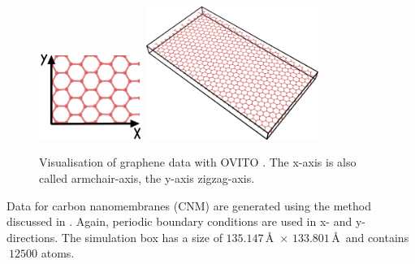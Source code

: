 \documentclass[preprint,12pt]{elsarticle}
\begin{document}
\begin{figure}[ht!]
\centering
\includegraphics[width=0.3\textwidth]{YM4CNM-f-2a.png}
\includegraphics[width=0.5\textwidth]{YM4CNM-f-2b.png}
\caption{Visualisation of graphene data with OVITO \cite{ovito}. 
The x-axis is also called armchair-axis, the y-axis zigzag-axis. \label{graphene}}
\end{figure}

Data for carbon nanomembranes (CNM) are generated using the method discussed in \cite{MrS:BN14,Gayk:M18,Mihlan:B21,EGV:PRB21,Ehrens:D22,Mihlan:M24}.
Again, periodic boundary conditions are used in x- and y-directions. 
The simulation box has a size of $135.147$\,\AA\,  $\times$ $133.801$\,\AA\, and contains $~12500$ atoms. 
\end{document}
